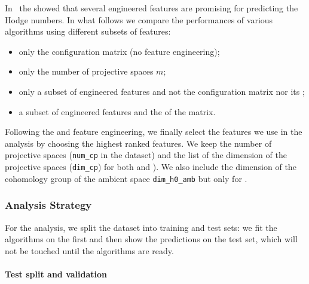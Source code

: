 In~ the \eda showed that several engineered features are promising for predicting the Hodge numbers.
In what follows we compare the performances of various algorithms using different subsets of features:
\begin{itemize}
  \item only the configuration matrix (no feature engineering);

  \item only the number of projective spaces $m$;

  \item only a subset of engineered features and not the configuration matrix nor its \pca;

  \item a subset of engineered features and the \pca of the matrix.
\end{itemize}

Following the \eda and feature engineering, we finally select the features we use in the analysis by choosing the highest ranked features.
We keep the number of projective spaces (\texttt{num\_cp} in the dataset) and the list of the dimension of the projective spaces (\texttt{dim\_cp}) for both  and ).
We also include the dimension of the cohomology group of the ambient space \texttt{dim\_h0\_amb} but only for .\footnotemark{}


\subsubsection{Analysis Strategy}
\label{sec:ml:strategy}

For the \ml analysis, we split the dataset into training and test sets: we fit the algorithms on the first and then show the predictions on the test set, which will not be touched until the algorithms are ready.


\paragraph{Test split and validation}

